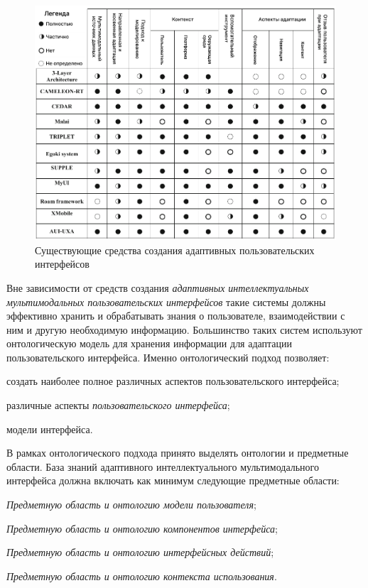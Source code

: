 \begin{figure}[H]
	\centering
	\includegraphics[scale=0.4]{author/part4/figures/adaptive_ui_tools.png}
	\caption{Существующие средства создания адаптивных пользовательских интерфейсов}
	\label{fig:adaptive_ui_tools}
\end{figure}

Вне зависимости от средств создания \textit{адаптивных интеллектуальных мультимодальных пользовательских интерфейсов} такие системы должны эффективно хранить и обрабатывать знания о пользователе, взаимодействии с ним и другую необходимую информацию. Большинство таких систем используют онтологическую модель для хранения информации для адаптации пользовательского интерфейса. Именно онтологический подход позволяет:
\begin{textitemize}
	\item создать наиболее полное  различных аспектов пользовательского интерфейса;
	\item {} различные аспекты \textit{пользовательского интерфейса};
	\item {} модели интерфейса.
\end{textitemize}

В рамках онтологического подхода принято выделять онтологии и предметные области. База знаний адаптивного интеллектуального мультимодального интерфейса должна включать как минимум следующие предметные области:
\begin{textitemize}
	\item \textit{Предметную область и онтологию модели пользователя}; 
	\item \textit{Предметную область и онтологию компонентов интерфейса};
	\item \textit{Предметную область и онтологию интерфейсных действий};
	\item \textit{Предметную область и онтологию контекста использования}.
\end{textitemize}

